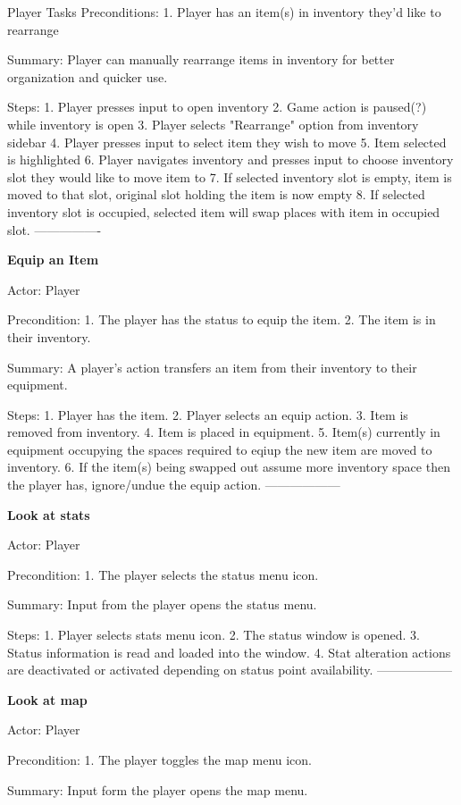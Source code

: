 \documentclass[12pt]{report}
\begin{document}
\begin {section}{Player Tasks}
Preconditions:
1. Player has an item(s) in inventory they'd like to rearrange

Summary: Player can manually rearrange items in inventory for better organization and quicker use.

Steps:
1. Player presses input to open inventory
2. Game action is paused(?) while inventory is open
3. Player selects "Rearrange" option from inventory sidebar
4. Player presses input to select item they wish to move
5. Item selected is highlighted
6. Player navigates inventory and presses input to choose inventory slot they would like to move item to
7. If selected inventory slot is empty, item is moved to that slot, original slot holding the item is now empty
8. If selected inventory slot is occupied, selected item will swap places with item in occupied slot. 
----------------

\textbf{Equip an Item} %

Actor: Player

Precondition: 
1. The player has the status to equip the item. 
2. The item is in their inventory.

Summary: A player's action transfers an item from their inventory to their equipment.

Steps:
1. Player has the item.
2. Player selects an equip action.
3. Item is removed from inventory.
4. Item is placed in equipment.
5. Item(s) currently in equipment occupying the spaces required to eqiup the new item are moved to inventory.
6. If the item(s) being swapped out assume more inventory space then the player has, ignore/undue the equip action.
------------------

\textbf{Look at stats} %

Actor: Player

Precondition:
1. The player selects the status menu icon.

Summary: Input from the player opens the status menu.

Steps:
1. Player selects stats menu icon.
2. The status window is opened.
3. Status information is read and loaded into the window.
4. Stat alteration actions are deactivated or activated depending on status point availability.
------------------

\textbf{Look at map} %

Actor: Player

Precondition:
1. The player toggles the map menu icon.

Summary: Input form the player opens the map menu.


\end{section}
\end{document}
